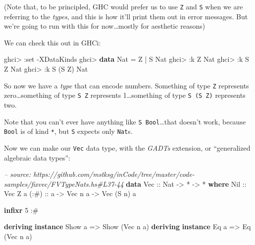 \documentclass[]{article}
\newenvironment{Shaded}{\begin{snugshade}}{\end{snugshade}}
\newcommand{\CommentTok}[1]{\textcolor[rgb]{0.56,0.35,0.01}{\textit{#1}}}
\newcommand{\DataTypeTok}[1]{\textcolor[rgb]{0.13,0.29,0.53}{#1}}
\newcommand{\DecValTok}[1]{\textcolor[rgb]{0.00,0.00,0.81}{#1}}
\newcommand{\FunctionTok}[1]{\textcolor[rgb]{0.00,0.00,0.00}{#1}}
\newcommand{\KeywordTok}[1]{\textcolor[rgb]{0.13,0.29,0.53}{\textbf{#1}}}
\newcommand{\NormalTok}[1]{#1}
\newcommand{\OtherTok}[1]{\textcolor[rgb]{0.56,0.35,0.01}{#1}}
\begin{document}
(Note that, to be principled, GHC would prefer us to use
\texttt{\textquotesingle{}Z} and \texttt{\textquotesingle{}S} when we are
referring to the \emph{types}, and this is how it'll print them out in error
messages. But we're going to run with this for now\ldots{}mostly for aesthetic
reasons)

We can check this out in GHCi:

\begin{Shaded}
\begin{Highlighting}[]
\NormalTok{ghci}\FunctionTok{>} \FunctionTok{:}\NormalTok{set }\FunctionTok{-}\DataTypeTok{XDataKinds}
\NormalTok{ghci}\FunctionTok{>} \KeywordTok{data} \DataTypeTok{Nat} \FunctionTok{=} \DataTypeTok{Z} \FunctionTok{|} \DataTypeTok{S} \DataTypeTok{Nat}
\NormalTok{ghci}\FunctionTok{>} \FunctionTok{:}\NormalTok{k }\DataTypeTok{Z}
\DataTypeTok{Nat}
\NormalTok{ghci}\FunctionTok{>} \FunctionTok{:}\NormalTok{k }\DataTypeTok{S} \DataTypeTok{Z}
\DataTypeTok{Nat}
\NormalTok{ghci}\FunctionTok{>} \FunctionTok{:}\NormalTok{k }\DataTypeTok{S}\NormalTok{ (}\DataTypeTok{S} \DataTypeTok{Z}\NormalTok{)}
\DataTypeTok{Nat}
\end{Highlighting}
\end{Shaded}

So now we have a \emph{type} that can encode numbers. Something of type
\texttt{Z} represents zero\ldots{}something of type \texttt{S\ Z} represents
1\ldots{}something of type \texttt{S\ (S\ Z)} represents two.

Note that you can't ever have anything like \texttt{S\ Bool}\ldots{}that doesn't
work, because \texttt{Bool} is of kind \texttt{*}, but \texttt{S} expects only
\texttt{Nat}s.

Now we can make our \texttt{Vec} data type, with the \emph{GADTs} extension, or
``generalized algebraic data types'':

\begin{Shaded}
\begin{Highlighting}[]
\CommentTok{-- source: https://github.com/mstksg/inCode/tree/master/code-samples/fixvec/FVTypeNats.hs#L37-44}
\KeywordTok{data} \DataTypeTok{Vec}\OtherTok{ ::} \DataTypeTok{Nat} \OtherTok{->} \FunctionTok{*} \OtherTok{->} \FunctionTok{*} \KeywordTok{where}
    \DataTypeTok{Nil}\OtherTok{  ::} \DataTypeTok{Vec} \DataTypeTok{Z}\NormalTok{ a}
\OtherTok{    (:#) ::}\NormalTok{ a }\OtherTok{->} \DataTypeTok{Vec}\NormalTok{ n a }\OtherTok{->} \DataTypeTok{Vec}\NormalTok{ (}\DataTypeTok{S}\NormalTok{ n) a}

\KeywordTok{infixr} \DecValTok{5} \FunctionTok{:#}

\KeywordTok{deriving} \KeywordTok{instance} \DataTypeTok{Show}\NormalTok{ a }\OtherTok{=>} \DataTypeTok{Show}\NormalTok{ (}\DataTypeTok{Vec}\NormalTok{ n a)}
\KeywordTok{deriving} \KeywordTok{instance} \DataTypeTok{Eq}\NormalTok{ a }\OtherTok{=>} \DataTypeTok{Eq}\NormalTok{ (}\DataTypeTok{Vec}\NormalTok{ n a)}
\end{Highlighting}
\end{Shaded}
\end{document}
